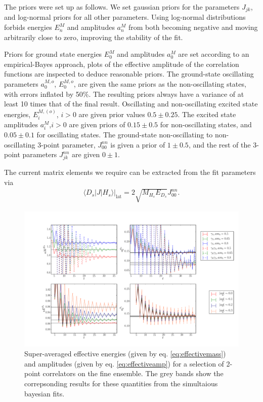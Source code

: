 The priors were set up as follows. We set gaussian priors for the parameters $J_{jk}$, and log-normal priors for all other parameters. Using log-normal distributions forbids energies $E_n^M$ and amplitudes $a_n^M$ from both becoming negative and moving arbitrarily close to zero, improving the stability of the fit.

Priors for ground state energies $E_0^M$ and amplitudes $a_0^M$ are set according to an empirical-Bayes approach, plots of the effective amplitude of the correlation functions are inspected to deduce reasonable priors. The ground-state oscillating parameters $a_0^{M,o}$, $E_0^{M,o}$, are given the same priors as the non-oscillating states, with errors inflated by 50\%. The resulting priors always have a variance of at least 10 times that of the final result. Oscillating and non-oscillating excited state energies, $E_i^{M,(o)}$, $i>0$ are given prior values $0.5\pm 0.25$. The excited state amplitudes $a_i^M$,$i>0$ are given priors of $0.15\pm 0.5$ for non-oscillating states, and $0.05\pm0.1$ for oscillating states. The ground-state non-oscillating to non-oscillating 3-point parameter, $J_{00}^{nn}$ is given a prior of $1\pm 0.5$, and the rest of the 3-point parameters $J_{jk}^{nn}$ are given $0\pm 1$.

The current matrix elements we require can be extracted from the fit parameters via
\begin{align}
  \langle D_s| J | H_s \rangle |_{\text{lat}} = 2 \sqrt{M_{H_s}E_{D_s}} J^{nn}_{00}.
  \label{eq:currentfit}
\end{align}

\begin{figure}[htb!]
  \hspace{-30pt}
    \hspace{-10pt}
    \includegraphics[width=1.2\textwidth]{images/BsDs/fine_2pt_summary.pdf}
    \caption{
Super-averaged effective energies (given by eq. \eqref{eq:effectivemass}) and amplitudes (given by eq. \eqref{eq:effectiveamp}) for a selection of 2-point correlators on the fine ensemble. The grey bands show the correpsonding results for these quantities from the simultaious bayesian fits.  \label{fig:2ptcorrs_BsDs}}
\end{figure}

